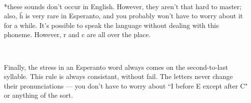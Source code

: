 \documentclass[11pt]{amsart}
\begin{document}
~\

*these sounds don't occur in English. However, they aren't that hard to master; also, \^h is very rare in Esperanto, and you probably won't have to worry about it for a while. It's possible to speak the language without dealing with this phoneme. However, r and c are all over the place. 

~\

Finally, the stress in an Esperanto word always comes on the second-to-last syllable. This rule is always consistant, without fail. The letters never change their pronunciations --- you don't have to worry about ``I before E except after C" or anything of the sort. 
\end{document}

